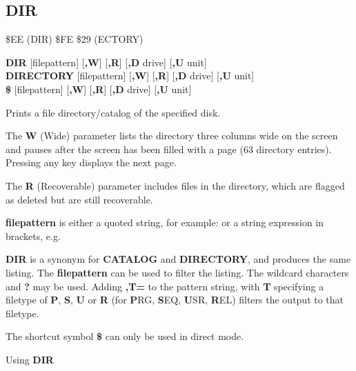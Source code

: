 
\newpage
\subsection{DIR}
\begin{description}[leftmargin=2cm,style=nextline]
\item [Token:] \$EE (DIR) \$FE \$29 (ECTORY)
\item [Format:] {\bf DIR} [filepattern] [{\bf,W}] [{\bf,R}] [{\bf,D} drive] [{\bf,U} unit] \\
		{\bf DIRECTORY} [filepattern] [{\bf,W}] [{\bf,R}] [{\bf,D} drive] [{\bf,U} unit] \\
		{\bf \$} [filepattern] [{\bf,W}] [{\bf,R}] [{\bf,D} drive] [{\bf,U} unit]
\item [Usage:]  Prints a file directory/catalog of the specified disk.

   The {\bf W} (Wide) parameter lists the directory three columns wide
   on the screen and pauses after the screen has been filled with a page
   (63 directory entries). Pressing any key displays the next page.

   The {\bf R} (Recoverable) parameter includes files in the
   directory, which are flagged as deleted but are still
   recoverable.

   {\bf filepattern} is either a quoted string, for example:  or
   a string expression in brackets, e.g. 

   \drivedefinition

   \unitdefinition

\item [Remarks:]
   {\bf DIR} is a synonym for {\bf CATALOG}
   and {\bf DIRECTORY}, and produces the same listing.
   The {\bf filepattern} can be used to filter the listing.
   The wildcard characters {\bf *} and {\bf ?} may be used.
   Adding {\bf ,T=} to the pattern string, with {\bf T} specifying
   a filetype of {\bf P}, {\bf S}, {\bf U} or {\bf R}
   (for {\bf P}RG, {\bf S}EQ, {\bf U}SR, {\bf R}EL) filters the
   output to that filetype.

   The shortcut symbol {\bf \$} can only be used in direct mode.

\item [Examples:] Using {\bf DIR}


%
%
%
%
%


\end{description}
